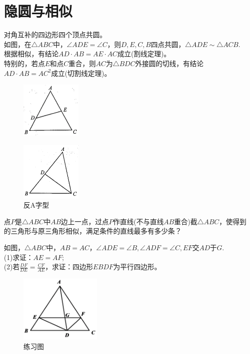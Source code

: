 \documentclass{ecnuthesis}
\begin{document}
\section{隐圆与相似}
\begin{model}
    对角互补的四边形四个顶点共圆。\\
    如图，在$\triangle ABC$中，$\angle ADE=\angle C$，则$D,E,C,B$四点共圆，$\triangle ADE \sim \triangle ACB.$ \\
    根据相似，有结论$AD·AB=AE·AC$成立(割线定理)。 \\
    特别的，若点$E$和点$C$重合，则$AC$为$\triangle BDC$外接圆的切线，有结论$AD·AB=AC^2$成立(切割线定理)。 \\
\end{model}
\begin{figure}[H]
\centering
\includegraphics[width=3cm]{picture/819.png}
\end{figure}
\begin{figure}[H]
\centering
\includegraphics[width=3cm]{picture/820.png}
\caption{反A字型}
\end{figure}
\begin{problem}
    点$P$是$\triangle ABC$中$AB$边上一点，过点$P$作直线(不与直线$AB$重合)截$\triangle ABC$，使得到的三角形与原三角形相似，满足条件的直线最多有多少条？\\
\end{problem}
\begin{problem}
    如图，$\triangle ABC$中，$AB=AC$，$\angle ADE=\angle B,\angle ADF=\angle C,EF$交$AD$于$G$. \\
    (1)求证：$AE=AF$; \\
    (2)若$\frac{DF}{DE}=\frac{CF}{AE}$，求证：四边形$EBDF$为平行四边形。 \\
\end{problem}
\begin{figure}[H]
\centering
\includegraphics[width=4cm]{picture/830.png}
\caption{练习图}
\end{figure}
\end{document}
